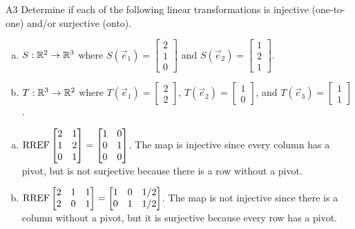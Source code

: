 \begin{problem}{A3}
Determine if each of the following linear transformations is injective (one-to-one) and/or surjective (onto).
\begin{enumerate}[(a)]
\item
  \(S: \mathbb{R}^2 \rightarrow \mathbb{R}^3\) where
  \(S(\vec e_1)=\begin{bmatrix}
    2 \\
    1 \\
    0
  \end{bmatrix}\) and
  \(S(\vec e_2)=\begin{bmatrix}
    1 \\
    2 \\
    1
  \end{bmatrix}\).
\item
  \(T: \mathbb{R}^3 \rightarrow \mathbb{R}^2\) where
  \(T(\vec e_1)=\begin{bmatrix}
    2 \\
    2
  \end{bmatrix}\),
  \(T(\vec e_2)=\begin{bmatrix}
   1  \\
   0
  \end{bmatrix}\), and
  \(T(\vec e_3)=\begin{bmatrix}
    1 \\
    1
  \end{bmatrix}\).
\end{enumerate}
\end{problem}
\begin{solution}
\begin{enumerate}[(a)]
\item
  \(\operatorname{RREF}\begin{bmatrix}
    2 & 1 \\
    1 & 2 \\
    0 & 1
  \end{bmatrix}=\begin{bmatrix}
    1 & 0 \\
    0 & 1 \\
    0 & 0
  \end{bmatrix}\).
  The map is injective since every column has a pivot, but is not surjective
  because there is a row without a pivot.
\item
  \(\operatorname{RREF}\begin{bmatrix}
    2 & 1 & 1 \\
    2 & 0 & 1
  \end{bmatrix}=\begin{bmatrix}
    1 & 0 & 1/2 \\
    0 & 1 & 1/2
  \end{bmatrix}\).
  The map is not injective since there is a column without a pivot,
  but it is surjective because every row has a pivot.
\end{enumerate}
\end{solution}

